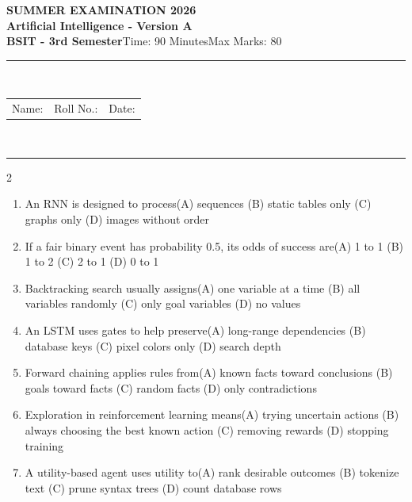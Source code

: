 \documentclass[a4paper]{article}
\makeatletter
\newcommand{\examheader}{%
\begin{center}\textbf{\large SUMMER EXAMINATION 2026}\\[-1pt]
\textbf{\normalsize Artificial Intelligence - Version A}\\[-1pt]
\textbf{BSIT - 3rd Semester}\quad Time: 90 Minutes\quad Max Marks: 80\\[-1pt]
\textcolor{black!65}{\rule{\linewidth}{0.45pt}}\\[-2pt]
\begin{tabularx}{\linewidth}{@{}X X X@{}}Name: \hrulefill & Roll No.: \hrulefill & Date: \hrulefill\end{tabularx}\\[-1pt]
\textcolor{black!65}{\rule{\linewidth}{0.45pt}}\end{center}}
\makeatother
\begin{document}
\examheader
\raggedcolumns
\begin{multicols*}{2}
\fontsize{8.5}{10}\selectfont
\begin{enumerate}
\item An RNN is designed to process\newline\hspace*{0.6em}(A) sequences \quad (B) static tables only \newline\hspace*{0.6em}(C) graphs only \quad (D) images without order
\item If a fair binary event has probability 0.5, its odds of success are\newline\hspace*{0.6em}(A) 1 to 1 \quad (B) 1 to 2 \newline\hspace*{0.6em}(C) 2 to 1 \quad (D) 0 to 1
\item Backtracking search usually assigns\newline\hspace*{0.6em}(A) one variable at a time \quad (B) all variables randomly \newline\hspace*{0.6em}(C) only goal variables \quad (D) no values
\item An LSTM uses gates to help preserve\newline\hspace*{0.6em}(A) long-range dependencies \quad (B) database keys \newline\hspace*{0.6em}(C) pixel colors only \quad (D) search depth
\item Forward chaining applies rules from\newline\hspace*{0.6em}(A) known facts toward conclusions \quad (B) goals toward facts \newline\hspace*{0.6em}(C) random facts \quad (D) only contradictions
\item Exploration in reinforcement learning means\newline\hspace*{0.6em}(A) trying uncertain actions \quad (B) always choosing the best known action \newline\hspace*{0.6em}(C) removing rewards \quad (D) stopping training
\item A utility-based agent uses utility to\newline\hspace*{0.6em}(A) rank desirable outcomes \quad (B) tokenize text \newline\hspace*{0.6em}(C) prune syntax trees \quad (D) count database rows

\end{enumerate}
\end{multicols*}
\end{document}
